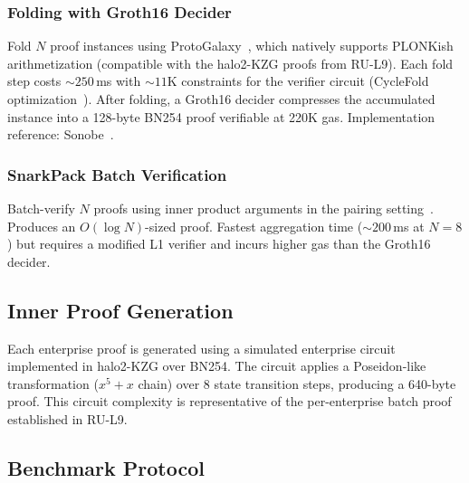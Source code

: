 \subsubsection{Folding with Groth16 Decider}

Fold $N$ proof instances using ProtoGalaxy~\cite{protogalaxy}, which
natively supports PLONKish arithmetization (compatible with the
halo2-KZG proofs from RU-L9). Each fold step costs ${\sim}250$\,ms
with ${\sim}11$K constraints for the verifier circuit (CycleFold
optimization~\cite{cyclefold}). After folding, a Groth16 decider
compresses the accumulated instance into a 128-byte BN254 proof
verifiable at 220K gas. Implementation reference:
Sonobe~\cite{sonobe-lib}.

\subsubsection{SnarkPack Batch Verification}

Batch-verify $N$ proofs using inner product arguments in the pairing
setting~\cite{snarkpack}. Produces an $O(\log N)$-sized proof. Fastest
aggregation time (${\sim}200$\,ms at $N{=}8$) but requires a modified
L1 verifier and incurs higher gas than the Groth16 decider.

\subsection{Inner Proof Generation}

Each enterprise proof is generated using a simulated enterprise circuit
implemented in halo2-KZG over BN254. The circuit applies a
Poseidon-like transformation ($x^5 + x$ chain) over 8 state transition
steps, producing a 640-byte proof. This circuit complexity is
representative of the per-enterprise batch proof established in RU-L9.

\subsection{Benchmark Protocol}

